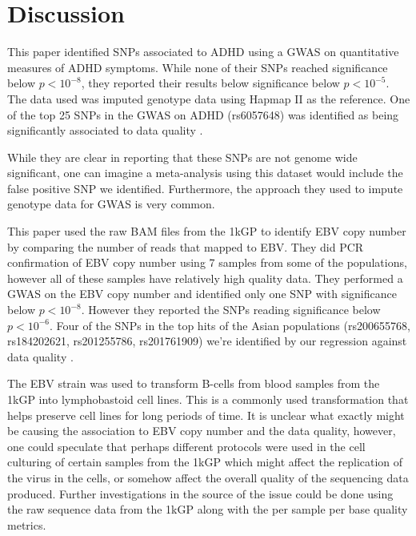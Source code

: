 \documentclass[9pt,lineno]{elife}
\newcommand{\sgcomment}[1]{\textcolor{blue}{SG: #1}}
\begin{document}
\section{Discussion}
			
This paper identified SNPs associated to ADHD using a GWAS on quantitative measures of ADHD symptoms.
While none of their SNPs reached significance below $ p < 10^{-8}$, they reported their results below significance below $ p < 10^{-5}$.
The data used was imputed genotype data using Hapmap II as the reference.
One of the top 25 SNPs in the GWAS on ADHD (rs6057648) was identified as being significantly associated to data quality \citep{Ebejer2013}.

While they are clear in reporting that these SNPs are not genome wide significant, one can imagine a meta-analysis using this dataset would include the false positive SNP we identified. 
Furthermore, the approach they used to impute genotype data for GWAS is very common.

This paper used the raw BAM files from the 1kGP to identify EBV copy number by comparing the number of reads that mapped to EBV.
They did PCR confirmation of EBV copy number using 7 samples from some of the populations, however all of these samples have relatively high quality data.
They performed a GWAS on the EBV copy number and identified only one SNP with significance below $ p < 10^{-8}$. 
However they reported the SNPs reading significance below $ p < 10^{-6}$. 
Four of the SNPs in the top hits of the Asian populations (rs200655768, rs184202621, rs201255786, rs201761909) we're identified by our regression against data quality \citep{Mandage2017}.

The EBV strain was used to transform B-cells from blood samples from the 1kGP into lymphobastoid cell lines.
This is a commonly used transformation that helps preserve cell lines for long periods of time.
It is unclear what exactly might be causing the association to EBV copy number and the data quality, however, one could speculate that perhaps different protocols were used in the cell culturing of certain samples from the 1kGP which might affect the replication of the virus in the cells, or somehow affect the overall quality of the sequencing data produced.
Further investigations in the source of the issue could be done using the raw sequence data from the 1kGP along with the per sample per base quality metrics. 			
\end{document}

